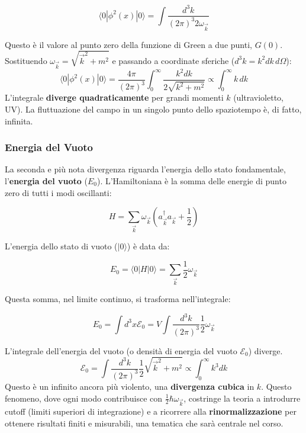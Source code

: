 \begin{equation}
\langle 0 | \phi^2(x) | 0 \rangle = \int \frac{d^3k}{(2\pi)^3 2\omega_{\vec{k}}}
\end{equation}

Questo è il valore al punto zero della funzione di Green a due punti, $G(0)$. Sostituendo $\omega_{\vec{k}} = \sqrt{\vec{k}^2 + m^2}$ e passando a coordinate sferiche ($d^3k = k^2 dk \, d\Omega$):
$$
\langle 0 | \phi^2(x) | 0 \rangle = \frac{4\pi}{(2\pi)^3} \int_0^\infty \frac{k^2 dk}{2\sqrt{k^2 + m^2}} \propto \int_0^\infty k \, dk
$$
L'integrale \textbf{diverge quadraticamente} per grandi momenti $k$ (ultravioletto, UV). La fluttuazione del campo in un singolo punto dello spaziotempo è, di fatto, infinita.

\subsubsection{Energia del Vuoto}

La seconda e più nota divergenza riguarda l'energia dello stato fondamentale, l'\textbf{energia del vuoto} ($E_0$). L'Hamiltoniana è la somma delle energie di punto zero di tutti i modi oscillanti:

\begin{equation}
H = \sum_{\vec{k}} \omega_{\vec{k}} \left(a_{\vec{k}}^\dagger a_{\vec{k}} + \frac{1}{2}\right)
\end{equation}

L'energia dello stato di vuoto ($|0\rangle$) è data da:

\begin{equation}
E_0 = \langle 0 | H | 0 \rangle = \sum_{\vec{k}} \frac{1}{2}\omega_{\vec{k}}
\end{equation}

Questa somma, nel limite continuo, si trasforma nell'integrale:

\begin{equation}
E_0 = \int d^3x \mathcal{E}_0 = V \int \frac{d^3k}{(2\pi)^3} \frac{1}{2}\omega_{\vec{k}}
\end{equation}

L'integrale dell'energia del vuoto (o densità di energia del vuoto $\mathcal{E}_0$) diverge.
$$
\mathcal{E}_0 = \int \frac{d^3k}{(2\pi)^3} \frac{1}{2}\sqrt{\vec{k}^2 + m^2} \propto \int_0^\infty k^3 dk
$$
Questo è un infinito ancora più violento, una \textbf{divergenza cubica} in $k$. Questo fenomeno, dove ogni modo contribuisce con $\frac{1}{2}\hbar\omega_{\vec{k}}$, costringe la teoria a introdurre cutoff (limiti superiori di integrazione) e a ricorrere alla \textbf{rinormalizzazione} per ottenere risultati finiti e misurabili, una tematica che sarà centrale nel corso.

